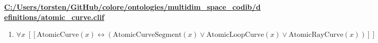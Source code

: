 \documentclass{article}
\begin{document}
\textbf{\url{C:/Users/torsten/GitHub/colore/ontologies/multidim\_space\_codib/definitions/atomic\_curve.clif}}

\begin{enumerate}
\item $\forall x\;  \left[ \left[ \textrm{AtomicCurve}(x) \leftrightarrow \left(\textrm{AtomicCurveSegment}(x) \lor \textrm{AtomicLoopCurve}(x) \lor \textrm{AtomicRayCurve}(x)\right) \right] \right]$
\end{enumerate}
\end{document}
